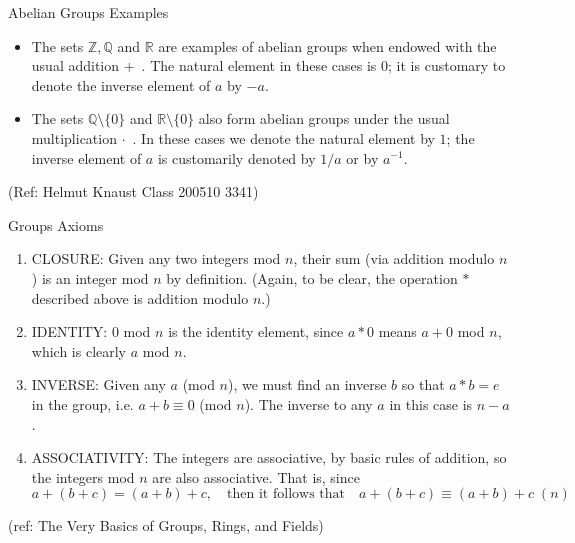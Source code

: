 \begin{frame}{Abelian Groups Examples}


\begin{itemize}
\item The sets $\mathbb{Z},\mathbb{Q}$ and $\mathbb{R}$ are examples of abelian groups
when endowed with the usual addition $+$\ . The natural element
in these cases is $0$; it is customary to denote the inverse
element of $a$ by $-a$.

\item The sets $\mathbb{Q}\setminus\{0\}$ and $\mathbb{R}\setminus\{0\}$ also form
abelian groups under the usual multiplication $\cdot$\ . In these
cases we denote the natural element by $1$; the inverse element
of $a$ is customarily denoted by $1/a$ or by $a^{-1}$.
\end{itemize}

\tiny{(Ref: Helmut Knaust Class 200510 3341)}

\end{frame}


\begin{frame}{Groups Axioms}


\begin{enumerate} 
\item CLOSURE: Given any two integers mod $n$, their sum (via addition modulo $n$) is an integer mod $n$ by definition. (Again, to be clear, the operation $\ast$ described above is addition modulo $n$.)
\item IDENTITY: 0 mod $n$ is the identity element, since $a \ast 0$ means $a + 0$ mod $n$, which is clearly $a$ mod $n$.
\item INVERSE: Given any $a$ (mod $n$), we must find an inverse $b$ so that $a \ast b = e$ in the group, i.e. $a + b \equiv 0$ (mod $n$). The inverse to any $a$ in this case is $n-a$.
\item ASSOCIATIVITY: The integers are associative, by basic rules of addition, so the integers mod $n$ are also associative. That is, since
$$ a + (b+c) = (a+b) + c, \quad \text{then it follows that} \quad a + (b+c) \equiv (a+b)+c \; (n) $$ 
\end{enumerate}

\tiny{(ref: The Very Basics of Groups, Rings, and Fields)}

\end{frame}

